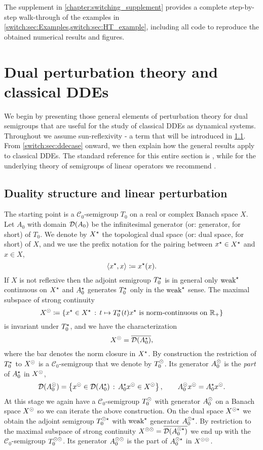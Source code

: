 The supplement in \cref{chapter:switching_supplement} provides a complete step-by-step walk-through of the examples in \cref{switch:sec:Examples,switch:sec:HT_example}, including all code to reproduce the obtained numerical results and figures.

\section{Dual perturbation theory and classical DDEs}\label{switch:sec:sunstar}
We begin by presenting those general elements of perturbation theory for dual semigroups that are useful for the study of classical DDEs as dynamical systems. Throughout we assume sun-reflexivity - a term that will be introduced in \cref{switch:sec:duality}. From \cref{switch:sec:ddecase} onward, we then explain how the general results apply to classical DDEs. The standard reference for this entire section is \cite{diekmann1995delay}, while for the underlying theory of semigroups of linear operators we recommend \cite{Engel2000, Engel2006}.

\subsection{Duality structure and linear perturbation}\label{switch:sec:duality}
The starting point is a $\mathcal{C}_0$-semigroup $T_0$ on a real or complex Banach space $X$. Let $A_0$ with domain $\mathcal{D}(A_0)$ be the infinitesimal generator (or: generator, for short) of $T_0$.  We denote by $X^{\star}$ the topological dual space (or: dual space, for short) of $X$, and we use the prefix notation for the pairing between $x^{\star} \in X^{\star}$ and $x \in X$,
\[
\langle x^{\star},x \rangle_{} \coloneqq x^{\star}(x).
\]
If $X$ is not reflexive then the adjoint semigroup $T_0^{\star}$ is in general only $\text{weak}^{\star}$ continuous on $X^{\star}$ and $A_0^{\star}$ generates $T_0^{\star}$ only in the $\text{weak}^{\star}$ sense. The maximal subspace of strong continuity
\[
X^{\odot} \coloneqq \left\{x^{\star} \in X^{\star}\,:\, t \mapsto T_0^{\star}(t)x^{\star} \text{ is norm-continuous on } \mathbb{R}_+\right\}
\]
is invariant under $T_0^{\star}$, and we have the characterization
\[
  X^{\odot} = \overline{\mathcal{D}(A_0^{\star})},
\]
where the bar denotes the norm closure in $X^{\star}$. By construction the restriction of $T_0^{\star}$ to $X^{\odot}$ is a $\mathcal{C}_0$-semigroup that we denote by $T_0^{\odot}$. Its generator $A_0^{\odot}$ is the \emph{part} of $A_0^{\star}$ in $X^{\odot}$,
%
\[
  \mathcal{D}(A_0^{\odot}) = \left\{x^{\odot} \in \mathcal{D}(A_0^{\star}) \,:\, A_0^{\star}x^{\odot} \in X^{\odot}\right\}, \qquad A_0^{\odot}x^{\odot} = A_0^{\star}x^{\odot}.
\]
%
At this stage we again have a $\mathcal{C}_0$-semigroup $T_0^{\odot}$ with generator $A_0^{\odot}$ on a Banach space $X^{\odot}$ so we can iterate the above construction. On the dual space $X^{\odot\star}$ we obtain the adjoint semigroup $T_0^{\odot\star}$ with $\text{weak}^{\star}$ generator $A_0^{\odot\star}$. By restriction to the maximal subspace of strong continuity $X^{\odot\odot} = \overline{\mathcal{D}(A_0^{\odot\star})}$ we end up with the $\mathcal{C}_0$-semigroup $T_0^{\odot\odot}$. Its generator $A_0^{\odot\odot}$ is the part of $A_0^{\odot\star}$ in $X^{\odot\odot}$.


